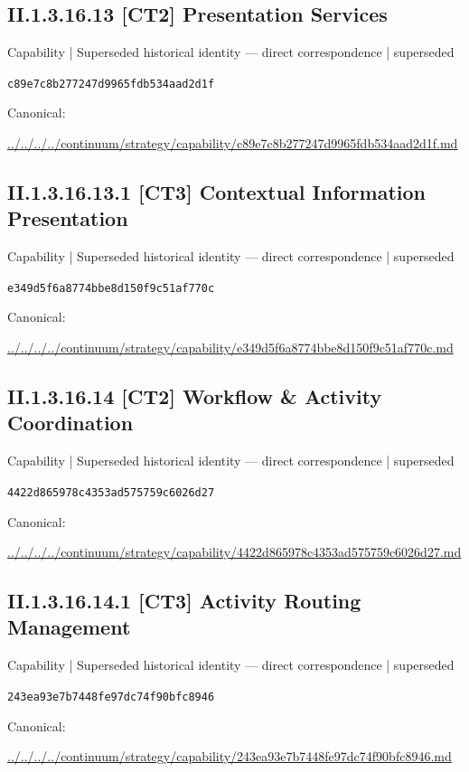\documentclass[10pt,a4paper]{article}
\begin{document}
\subsection*{II.1.3.16.13 [CT2] Presentation Services}
{\small Capability | Superseded historical identity — direct correspondence | superseded}\par
\texttt{c89e7c8b277247d9965fdb534aad2d1f}\par
Canonical: \par
{\footnotesize\url{../../../../continuum/strategy/capability/c89e7c8b277247d9965fdb534aad2d1f.md}}\par
\subsection*{II.1.3.16.13.1 [CT3] Contextual Information Presentation}
{\small Capability | Superseded historical identity — direct correspondence | superseded}\par
\texttt{e349d5f6a8774bbe8d150f9c51af770c}\par
Canonical: \par
{\footnotesize\url{../../../../continuum/strategy/capability/e349d5f6a8774bbe8d150f9c51af770c.md}}\par
\subsection*{II.1.3.16.14 [CT2] Workflow \& Activity Coordination}
{\small Capability | Superseded historical identity — direct correspondence | superseded}\par
\texttt{4422d865978c4353ad575759c6026d27}\par
Canonical: \par
{\footnotesize\url{../../../../continuum/strategy/capability/4422d865978c4353ad575759c6026d27.md}}\par
\subsection*{II.1.3.16.14.1 [CT3] Activity Routing Management}
{\small Capability | Superseded historical identity — direct correspondence | superseded}\par
\texttt{243ea93e7b7448fe97dc74f90bfc8946}\par
Canonical: \par
{\footnotesize\url{../../../../continuum/strategy/capability/243ea93e7b7448fe97dc74f90bfc8946.md}}\par
\end{document}
